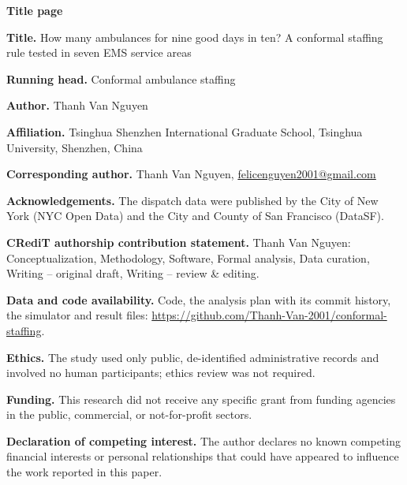 \documentclass[12pt]{article}
\begin{document}
\textbf{\large Title page}

\textbf{Title.} How many ambulances for nine good days in ten? A conformal staffing rule tested in seven EMS service areas

\textbf{Running head.} Conformal ambulance staffing

\textbf{Author.} Thanh Van Nguyen

\textbf{Affiliation.} Tsinghua Shenzhen International Graduate School, Tsinghua University, Shenzhen, China

\textbf{Corresponding author.} Thanh Van Nguyen, \href{mailto:felicenguyen2001@gmail.com}{felicenguyen2001@gmail.com}

\textbf{Acknowledgements.} The dispatch data were published by the City of New York (NYC Open Data) and the City and County of San Francisco (DataSF).

\textbf{CRediT authorship contribution statement.} Thanh Van Nguyen: Conceptualization, Methodology, Software, Formal analysis, Data curation, Writing -- original draft, Writing -- review \& editing.

\textbf{Data and code availability.} Code, the analysis plan with its commit history, the simulator and result files: \url{https://github.com/Thanh-Van-2001/conformal-staffing}.

\textbf{Ethics.} The study used only public, de-identified administrative records and involved no human participants; ethics review was not required.

\textbf{Funding.} This research did not receive any specific grant from funding agencies in the public, commercial, or not-for-profit sectors.

\textbf{Declaration of competing interest.} The author declares no known competing financial interests or personal relationships that could have appeared to influence the work reported in this paper.
\end{document}
